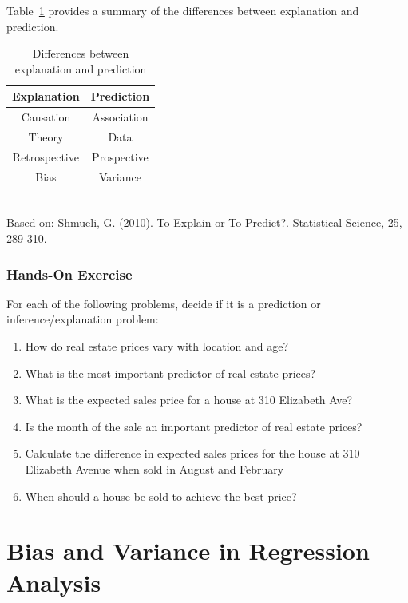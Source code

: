 Table~\ref{tab:predictexplain} provides a summary of the differences between explanation and prediction. 

\begin{table}
\centering
\renewcommand{\arraystretch}{1.25}

\begin{tabular}{c|c} \hline
\textbf{Explanation} & \textbf{Prediction} \\ \hline
Causation & Association \\
Theory & Data \\
Retrospective & Prospective \\
Bias & Variance \\ \hline
\end{tabular} \\
\vspace{5mm}
\small{Based on: Shmueli, G. (2010). To Explain or To Predict?. Statistical Science, 25, 289-310.}
\caption{Differences between explanation and prediction}
\label{tab:predictexplain}
\end{table}

\begin{tcolorbox}[colback=code]
\subsubsection*{Hands-On Exercise}

For each of the following problems, decide if it is a prediction or inference/explanation problem:
\begin{enumerate}
   \item How do real estate prices vary with location and age?
   \item What is the most important predictor of real estate prices?
   \item What is the expected sales price for a house at 310 Elizabeth Ave?
   \item Is the month of the sale an important predictor of real estate prices?
   \item Calculate the difference in expected sales prices for the house at 310 Elizabeth Avenue when sold in August and February
   \item When should a house be sold to achieve the best price?
\end{enumerate}
\end{tcolorbox}

\section{Bias and Variance in Regression Analysis}

